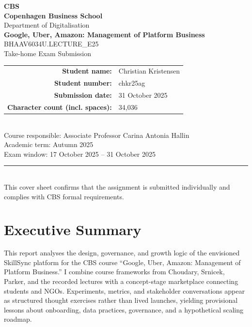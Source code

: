 \documentclass[12pt,a4paper]{article}
\newcommand{\university}{Copenhagen Business School}
\newcommand{\faculty}{Department of Digitalisation}
\newcommand{\examTitle}{Google, Uber, Amazon: Management of Platform Business}
\newcommand{\examCode}{BHAAV6034U.LECTURE\_E25}
\newcommand{\examType}{Take-home Exam Submission}
\newcommand{\studentName}{Christian Kristensen}
\newcommand{\studentId}{chkr25ag}
\newcommand{\submissionDate}{31 October 2025}
\newcommand{\wordCount}{34,036}
\begin{document}
\begin{titlepage}
  \thispagestyle{empty}
  \centering
  {\Large \textcolor{gray!70}{\textbf{CBS}}}\\[1cm]
  {\Large \textbf{\university}}\\[0.5cm]
  {\large \faculty}\\[1.5cm]
  {\LARGE \textbf{\examTitle}}\\[0.5cm]
  {\large \examCode\\\examType}\\[1.5cm]
  \begin{tabular}{rl}
    \textbf{Student name:} & \studentName \\
    \textbf{Student number:} & \studentId \\
    \textbf{Submission date:} & \submissionDate \\
    \textbf{Character count (incl. spaces):} & \wordCount \\
  \end{tabular}\\[1.5cm]
  \vfill
  {\large Course responsible: Associate Professor Carina Antonia Hallin}\\[0.3cm]
  {\large Academic term: Autumn 2025}\\[0.3cm]
  {\large Exam window: 17 October 2025 -- 31 October 2025}\\[1.5cm]
  \rule{0.8\linewidth}{0.4pt}\\[0.5cm]
  {\small This cover sheet confirms that the assignment is submitted individually and complies with CBS formal requirements.}
\end{titlepage}

\setcounter{secnumdepth}{-1}
\makeatletter
\renewcommand{\numberline}[1]{}
\makeatother

\section*{Executive Summary}
This report analyses the design, governance, and growth logic of the envisioned SkillSync platform for the CBS course ``Google, Uber, Amazon: Management of Platform Business.'' I combine course frameworks from Choudary, Srnicek, Parker, and the recorded lectures with a concept-stage marketplace connecting students and NGOs. Experiments, metrics, and stakeholder conversations appear as structured thought exercises rather than lived launches, yielding provisional lessons about onboarding, data practices, governance, and a hypothetical scaling roadmap.
\end{document}
